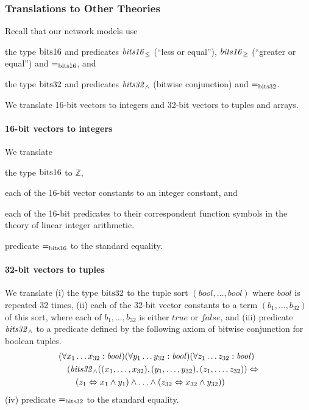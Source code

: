\subsubsection*{Translations to Other Theories}
Recall that our network models use
\begin{enumerate*}[label=(\roman*)]
  \item the type $\mathrm{bits16}$ and predicates $\mathit{bits16}_{\le}$ (``less or equal''), $\mathit{bits16}_{\ge}$ (``greater or equal'') and $\mathit{=}_{\mathrm{bits16}}$, and
  \item the type $\mathrm{bits32}$ and predicates $\mathit{bits32}_\wedge$ (bitwise conjunction) and $\mathit{=}_{\mathrm{bits32}}$.
\end{enumerate*}
We translate 16-bit vectors to integers and 32-bit vectors to tuples and arrays.

\paragraph{16-bit vectors to integers}
We translate
\begin{enumerate*}[label=(\roman*)]
  \item the type $\mathrm{bits16}$ to $\mathbb{Z}$,
  \item each of the 16-bit vector constants to an integer constant, and
  \item each of the 16-bit predicates to their correspondent function symbols in the theory of linear integer arithmetic.
  \item predicate $\mathit{=}_{\mathrm{bits16}}$ to the standard equality.
\end{enumerate*}

\paragraph{32-bit vectors to tuples}
We translate
(i) the type $\mathrm{bits32}$ to the tuple sort $(\mathit{bool},\ldots,\mathit{bool})$ where $\mathit{bool}$ is repeated 32 times,
(ii) each of the 32-bit vector constants to a term $(b_1,\ldots,b_{32})$ of this sort, where each of $b_1,\ldots,b_{32}$ is either $\mathit{true}$ or $\mathit{false}$, and
(iii) predicate $\mathit{bits32}_\wedge$ to a predicate defined by the following axiom of bitwise conjunction for boolean tuples.
\begin{equation*}
\begin{aligned}
&(\forall x_1\ldots x_{32}:\mathit{bool})(\forall y_1\ldots y_{32}:\mathit{bool})(\forall z_1\ldots z_{32}:\mathit{bool})\\
&\quad(\mathit{bits32}_\wedge((x_1,\ldots,x_{32}),(y_1,\ldots,y_{32}),(z_1,\ldots,z_{32}))\Leftrightarrow\\
&\quad\quad (z_1\Leftrightarrow x_1\wedge y_1)\wedge\ldots\wedge(z_{32}\Leftrightarrow x_{32}\wedge y_{32}))
\end{aligned}
\end{equation*}
(iv) predicate $\mathit{=}_{\mathrm{bits32}}$ to the standard equality.

